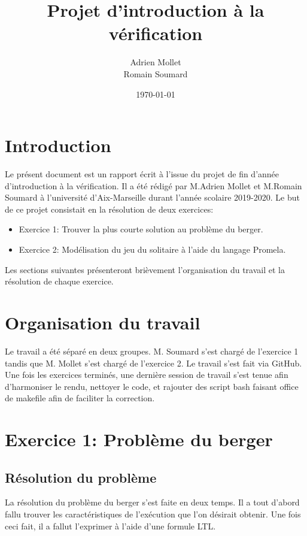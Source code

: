 \documentclass[12pt, a4paper]{report}
\title{\color{blue}Projet d'introduction à la vérification}
\date{\today}
\author{Adrien Mollet\\ Romain Soumard}
\begin{document}
\maketitle

\section{Introduction}

Le présent document est un rapport écrit à l'issue du projet de fin d'année d'introduction à la vérification. Il a été rédigé par M.Adrien Mollet et M.Romain Soumard à l'université d'Aix-Marseille durant l'année scolaire 2019-2020.
Le but de ce projet consistait en la résolution de deux exercices:
\begin{itemize}
\item Exercice 1: Trouver la plus courte solution au problème du berger.
\item Exercice 2: Modélisation du jeu du solitaire à l'aide du langage Promela.
\end{itemize}
Les sections suivantes présenteront brièvement l'organisation du travail et la résolution de chaque exercice.

\section{Organisation du travail}

Le travail a été séparé en deux groupes. M. Soumard s'est chargé de l'exercice 1 tandis que M. Mollet s'est chargé de l'exercice 2. Le travail s'est fait via GitHub. Une fois les exercices terminés, une dernière session de travail s'est tenue afin d'harmoniser le rendu, nettoyer le code, et rajouter des script bash faisant office de makefile afin de faciliter la correction.

\section{Exercice 1: Problème du berger}

\subsection{Résolution du problème}

La résolution du problème du berger s'est faite en deux temps. Il a tout d'abord fallu trouver les caractéristiques de l'exécution que l'on désirait obtenir. Une fois ceci fait, il a fallut l'exprimer à l'aide d'une formule LTL.
\end{document}
